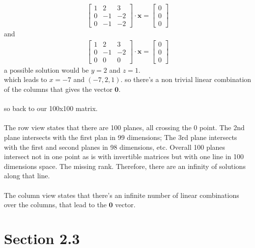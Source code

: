 \documentclass[a4paper,11pt]{article}
\newcommand{\mybf}[1]{\boldsymbol{#1}}
\begin{document}
\begin{enumerate}[label=\alph*]
\begin{align}
\begin{bmatrix} 
    1 & 2 & 3\\
    0 & -1 & -2\\
    0 & -1 & -2 
\end{bmatrix}
\cdot
\mybf{x}
=
\begin{bmatrix} 
    0\\
    0\\
    0 
\end{bmatrix}
\end{align}
and
\begin{align}
\begin{bmatrix} 
    1 & 2 & 3\\
    0 & -1 & -2\\
    0 & 0 & 0 
\end{bmatrix}
\cdot
\mybf{x}
=
\begin{bmatrix} 
    0\\
    0\\
    0 
\end{bmatrix}
\end{align}
a possible solution would be $y=2$ and $z=1$. \\
which leads to $x=-7$ and $(-7, 2, 1)$.
so there's a non trivial linear combination of the columns that gives the vector $\mybf{0}$. \\\\
so back to our 100x100 matrix.\\\\
The row view states that there are 100 planes, all crossing the 0 point. The 2nd plane intersects with the first plan in 99 dimensions; The 3rd plane intersects with the first and second planes in 98 dimensions, etc. Overall 100 planes intersect not in one point as is with invertible matrices but with one line in 100 dimensions space. The missing rank. Therefore, there are an infinity of solutions along that line.\\\\
The column view states that there's an infinite number of linear combinations over the columns, that lead to the $\mybf{0}$ vector.
\end{enumerate}

\section*{Section 2.3}
\end{document}
